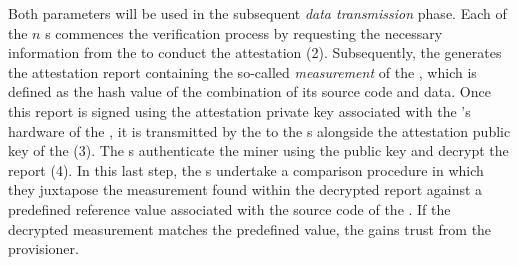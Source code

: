 Both parameters will be used in the subsequent \textit{data transmission} phase. Each of the $n$ s commences the verification process by requesting the necessary information from the  to conduct the attestation (2). Subsequently, the  generates the attestation report containing the so-called \emph{measurement} of the , which is defined as the hash value of the combination of its source code and data. Once this report is signed using the attestation private key associated with the 's hardware of the , it is transmitted by the  to the s alongside the attestation public key of the  (3). The s authenticate the miner using the public key and decrypt the report (4). In this last step, the s undertake a comparison procedure in which they juxtapose the measurement found within the decrypted report against a predefined reference value associated with the source code of the . If the decrypted measurement matches the predefined value, the  gains trust from the provisioner.

